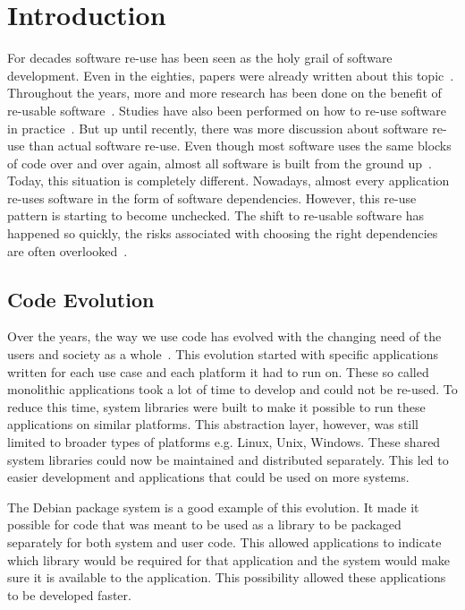 \chapter{Introduction}

For decades software re-use has been seen as the holy grail of software development. Even in the eighties, papers were already written about this topic~\cite{standish1984essay}. Throughout the years, more and more research has been done on the benefit of re-usable software~\cite{jacobson1997software}. Studies have also been performed on how to re-use software in practice~\cite{reifer1997practical}. But up until recently, there was more discussion about software re-use than actual software re-use. Even though most software uses the same blocks of code over and over again, almost all software is built from the ground up~\cite{frakes2005software}. Today, this situation is completely different. Nowadays, almost every application re-uses software in the form of software dependencies. However, this re-use pattern is starting to become unchecked. The shift to re-usable software has happened so quickly, the risks associated with choosing the right dependencies are often overlooked~\cite{cox2019surviving}. 

\section{Code Evolution}
Over the years, the way we use code has evolved with the changing need of the users and society as a whole~\cite{rajlich2014software}. This evolution started with specific applications written for each use case and each platform it had to run on. These so called monolithic applications took a lot of time to develop and could not be re-used. To reduce this time, system libraries were built to make it possible to run these applications on similar platforms. This abstraction layer, however, was still limited to broader types of platforms e.g. Linux, Unix, Windows. These shared system libraries could now be maintained and distributed separately. This led to easier development and applications that could be used on more systems.

The Debian package system is a good example of this evolution. It made it possible for code that was meant to be used as a library to be packaged separately for both system and user code. This allowed applications to indicate which library would be required for that application and the system would make sure it is available to the application. This possibility allowed these applications to be developed faster. ~\cite{zacchiroli2011debian}

